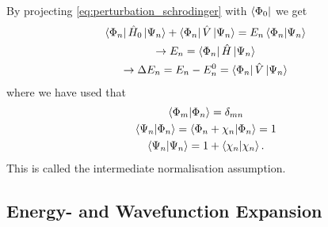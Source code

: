 By projecting \autoref{eq:perturbation_schrodinger} with $\bra{\Phi_0}$ we get
\begin{equation}
    \begin{gathered}
    \bra{\Phi_n} \hat{H}_0 \ket{\Psi_n} + \bra{\Phi_n} \hat{V} \ket{\Psi_n}
        = E_n \braket{\Phi_n}{\Psi_n} \\
    \to E_n = \bra{\Phi_n} \hat{H} \ket{\Psi_n} \\
    \to \Delta E_n = E_n - E_n^{0} = \bra{\Phi_n} \hat{V} \ket{\Psi_n}
    \end{gathered}
\end{equation}
where we have used that 
\begin{gather}
    \label{eq:intermediate_normalisation}
    \braket{\Phi_m}{\Phi_n} = \delta_{mn} \\
    \braket{\Psi_n}{\Phi_n} = \braket{\Phi_n + \chi_n}{\Phi_n} = 1 \\
    \braket{\Psi_n} = 1 + \braket{\chi_n}.
\end{gather}
This is called the intermediate normalisation assumption.

\subsection{Energy- and Wavefunction Expansion}

